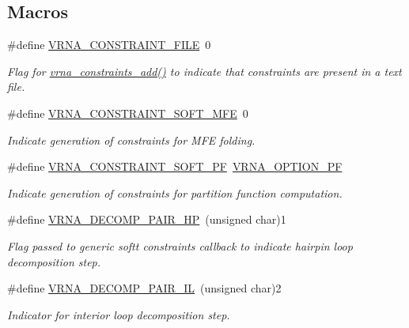 \subsection*{Macros}
\begin{DoxyCompactItemize}
\item 
\#define \hyperlink{group__constraints_ga62e0ed0c33002c09423de4e646f85a2b}{V\+R\+N\+A\+\_\+\+C\+O\+N\+S\+T\+R\+A\+I\+N\+T\+\_\+\+F\+I\+LE}~0
\begin{DoxyCompactList}\small\item\em Flag for \hyperlink{group__constraints_ga35a401f680969a556858a8dd5f1d07cc}{vrna\+\_\+constraints\+\_\+add()} to indicate that constraints are present in a text file. \end{DoxyCompactList}\item 
\#define \hyperlink{group__constraints_ga62aa195893d02d1a79ca94952748df36}{V\+R\+N\+A\+\_\+\+C\+O\+N\+S\+T\+R\+A\+I\+N\+T\+\_\+\+S\+O\+F\+T\+\_\+\+M\+FE}~0
\begin{DoxyCompactList}\small\item\em Indicate generation of constraints for M\+FE folding. \end{DoxyCompactList}\item 
\#define \hyperlink{group__constraints_ga03fb5000c19b9a2082bf4ea30a543045}{V\+R\+N\+A\+\_\+\+C\+O\+N\+S\+T\+R\+A\+I\+N\+T\+\_\+\+S\+O\+F\+T\+\_\+\+PF}~\hyperlink{group__fold__compound_gabfbadcddda3e74ce7f49035ef8f058f7}{V\+R\+N\+A\+\_\+\+O\+P\+T\+I\+O\+N\+\_\+\+PF}
\begin{DoxyCompactList}\small\item\em Indicate generation of constraints for partition function computation. \end{DoxyCompactList}\item 
\#define \hyperlink{group__constraints_ga8bd41ebc8039378d242e4e8c273716a5}{V\+R\+N\+A\+\_\+\+D\+E\+C\+O\+M\+P\+\_\+\+P\+A\+I\+R\+\_\+\+HP}~(unsigned char)1
\begin{DoxyCompactList}\small\item\em Flag passed to generic softt constraints callback to indicate hairpin loop decomposition step. \end{DoxyCompactList}\item 
\#define \hyperlink{group__constraints_gaeab04f34d7730cff2d651d782f95d857}{V\+R\+N\+A\+\_\+\+D\+E\+C\+O\+M\+P\+\_\+\+P\+A\+I\+R\+\_\+\+IL}~(unsigned char)2
\begin{DoxyCompactList}\small\item\em Indicator for interior loop decomposition step. \end{DoxyCompactList}\item 

\end{DoxyCompactItemize}
